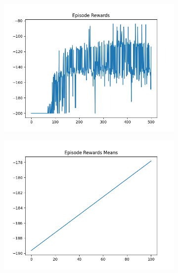 \begin{figure}[H]
\begin{subfigure}{.47\linewidth}
        \includegraphics[width=\textwidth]{mountain/2024-06-15_12-35-51_dqn_mountaincar_episode_rewards.png}
    \end{subfigure}
    \begin{subfigure}{.47\linewidth}
        \centering
        \includegraphics[width=\textwidth]{mountain/2024-06-15_13-45-47_dqn_mountaincar_episode_rewards_means.png}
    \end{subfigure}
\end{figure}
